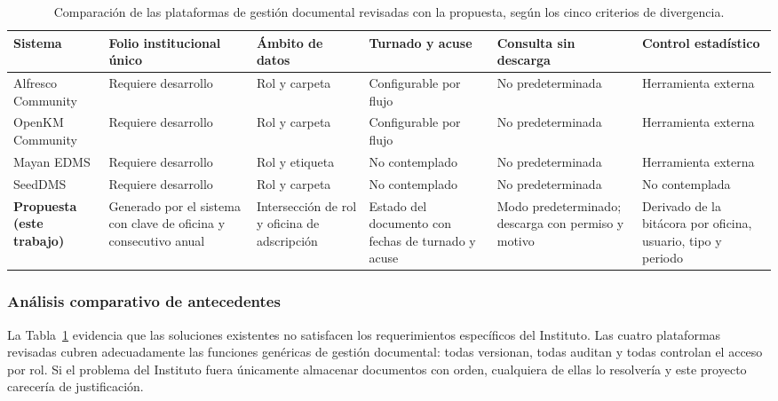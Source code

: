 \begin{table}[H]
  \centering
  \small
  \renewcommand{\arraystretch}{1.3}
  \caption{Comparación de las plataformas de gestión documental revisadas con la propuesta, según los cinco criterios de divergencia.}
  \label{tab:comparativa_antecedentes}
  \begin{tabularx}{\textwidth}{@{}>{\raggedright\arraybackslash}p{2.3cm}
      >{\raggedright\arraybackslash}X
      >{\raggedright\arraybackslash}X
      >{\raggedright\arraybackslash}X
      >{\raggedright\arraybackslash}X
      >{\raggedright\arraybackslash}X@{}}
    \toprule
    \textbf{Sistema} & \textbf{Folio institucional único} & \textbf{Ámbito de datos} & \textbf{Turnado y acuse} & \textbf{Consulta sin descarga} & \textbf{Control estadístico} \\
    \midrule
    Alfresco Community \cite{alfresco} & Requiere desarrollo & Rol y carpeta & Configurable por flujo & No predeterminada & Herramienta externa \\
    OpenKM Community \cite{openkm} & Requiere desarrollo & Rol y carpeta & Configurable por flujo & No predeterminada & Herramienta externa \\
    Mayan EDMS \cite{mayanedms} & Requiere desarrollo & Rol y etiqueta & No contemplado & No predeterminada & Herramienta externa \\
    SeedDMS \cite{seeddms} & Requiere desarrollo & Rol y carpeta & No contemplado & No predeterminada & No contemplada \\
    \midrule
    \textbf{Propuesta (este trabajo)} & Generado por el sistema con clave de oficina y consecutivo anual & Intersección de rol y oficina de adscripción & Estado del documento con fechas de turnado y acuse & Modo predeterminado; descarga con permiso y motivo & Derivado de la bitácora por oficina, usuario, tipo y periodo \\
    \bottomrule
  \end{tabularx}
\end{table}

\subsubsection{Análisis comparativo de antecedentes}

La Tabla~\ref{tab:comparativa_antecedentes} evidencia que las soluciones existentes no satisfacen los requerimientos específicos del Instituto. Las cuatro plataformas revisadas cubren adecuadamente las funciones genéricas de gestión documental: todas versionan, todas auditan y todas controlan el acceso por rol. Si el problema del Instituto fuera únicamente almacenar documentos con orden, cualquiera de ellas lo resolvería y este proyecto carecería de justificación.

